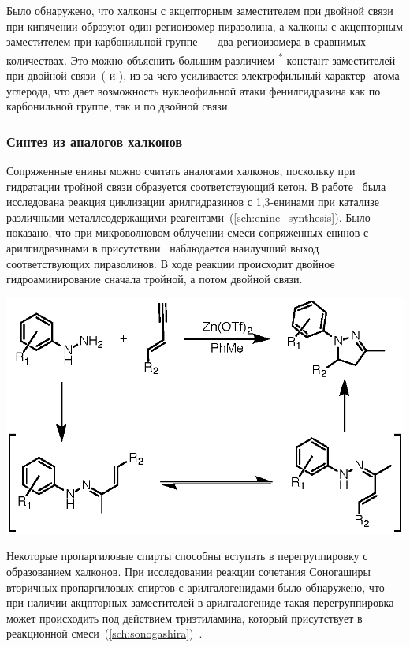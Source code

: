 Было обнаружено, что халконы с акцепторным заместителем при двойной связи при кипячении образуют один региоизомер пиразолина, а халконы с акцепторным заместителем при карбонильной группе~--- два региоизомера в сравнимых количествах.
Это можно объяснить большим различием \chemsigma\textsuperscript{*}-констант заместителей при двойной связи~( и ), из-за чего усиливается электрофильный характер \chembeta-атома углерода, что дает возможность нуклеофильной атаки фенилгидразина как по карбонильной группе, так и по двойной связи.
\FloatBarrier{}

\subsubsection{Синтез из аналогов халконов}
Сопряженные енины можно считать аналогами халконов, поскольку при гидратации тройной связи образуется соответствующий кетон.
В работе~\cite{Patil2011} была исследована реакция циклизации арилгидразинов с 1,3-енинами при катализе различными металлсодержащими реагентами~(\ref{sch:enine_synthesis}).
Было показано, что при микроволновом облучении смеси сопряженных енинов с арилгидразинами в присутствии~ наблюдается наилучший выход соответствующих пиразолинов.
В ходе реакции происходит двойное гидроаминирование сначала тройной, а потом двойной связи.

\begin{scheme}[h!]
    \centering
    \includegraphics{sections/literature/img/enine_synthesis.eps}
    \caption{}
    \label{sch:enine_synthesis}
\end{scheme}

Некоторые пропаргиловые спирты способны вступать в перегруппировку с образованием халконов.
При исследовании реакции сочетания Соногаширы вторичных пропаргиловых спиртов с арилгалогенидами было обнаружено, что при наличии акцпторных заместителей в арилгалогениде такая перегруппировка может происходить под действием триэтиламина, который присутствует в реакционной смеси~(\ref{sch:sonogashira})~\cite{Muller2000}.

